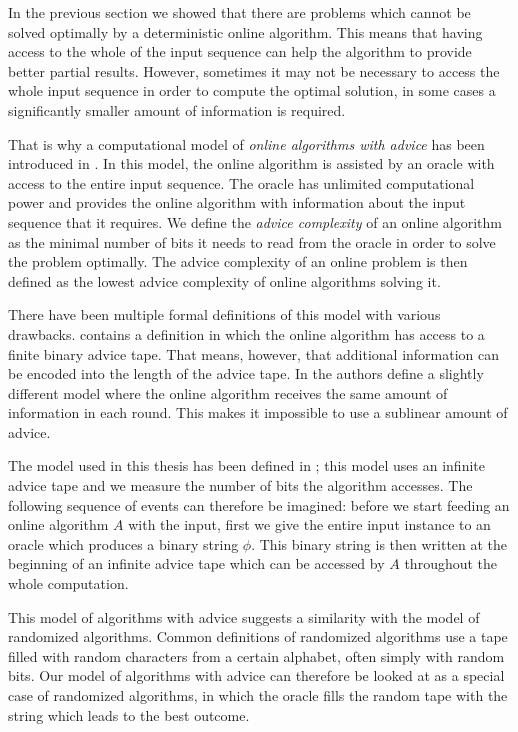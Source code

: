 In the previous section we showed that there are problems which cannot be
solved optimally by a deterministic online algorithm. This means that
having access to the whole of the input sequence can help the algorithm to
provide better partial results. However, sometimes it may not be necessary
to access the whole input sequence in order to compute the optimal
solution, in some cases a significantly smaller amount of information is
required.

That is why a computational model of \emph{online algorithms with advice}
has been introduced in \cite{advice-first}. In this model, the online
algorithm is assisted by an oracle with access to the entire input
sequence. The oracle has unlimited computational power and provides the
online algorithm with information about the input sequence that it
requires. We define the \emph{advice complexity} of an online algorithm as
the minimal number of bits it needs to read from the oracle in order to
solve the problem optimally. The advice complexity of an online problem is
then defined as the lowest advice complexity of online algorithms solving
it.

There have been multiple formal definitions of this model with various
drawbacks. \cite{advice-first} contains a definition in which the online
algorithm has access to a finite binary advice tape. That means, however,
that additional information can be encoded into the length of the advice
tape. In \cite{advice-constant} the authors define a slightly different
model where the online algorithm receives the same amount of information
in each round. This makes it impossible to use a sublinear amount of
advice.

The model used in this thesis has been defined in \cite{advice-infinite};
this model uses an infinite advice tape and we measure the number of bits
the algorithm accesses. The following sequence of events can therefore be
imagined: before we start feeding an online algorithm $A$ with the input,
first we give the entire input instance to an oracle which produces a
binary string $\phi$. This binary string is then written at the beginning
of an infinite advice tape which can be accessed by $A$ throughout the
whole computation.

This model of algorithms with advice suggests a similarity with the model
of randomized algorithms. Common definitions of randomized algorithms use
a tape filled with random characters from a certain alphabet, often simply
with random bits. Our model of algorithms with advice can therefore be
looked at as a special case of randomized algorithms, in which the oracle
fills the random tape with the string which leads to the best outcome.

